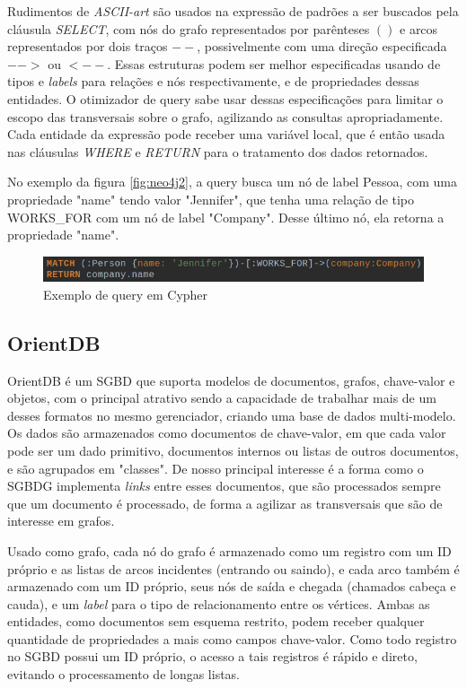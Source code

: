 \documentclass[conference]{IEEEtran}
\begin{document}
Rudimentos de \emph{ASCII-art} são usados na expressão de padrões a ser buscados pela cláusula \emph{SELECT}, com nós do grafo representados por parênteses $()$ e arcos representados por dois traços $--$, possivelmente com uma direção especificada $-->$ ou $<--$. Essas estruturas podem ser melhor especificadas usando de tipos e \emph{labels} para relações e nós respectivamente, e de propriedades dessas entidades. O otimizador de query sabe usar dessas especificações para limitar o escopo das transversais sobre o grafo, agilizando as consultas apropriadamente. Cada entidade da expressão pode receber uma variável local, que é então usada nas cláusulas \emph{WHERE} e \emph{RETURN} para o tratamento dos dados retornados.

No exemplo da figura \ref{fig:neo4j2}, a query busca um nó de label Pessoa, com uma propriedade "name" tendo valor "Jennifer", que tenha uma relação de tipo WORKS\_FOR com um nó de label "Company". Desse último nó, ela retorna a propriedade "name".

\begin{figure}[htbp]
\centerline{\includegraphics[width=0.9\linewidth]{img/neo4j/neo4j_ps2.png}}
\caption{Exemplo de query em Cypher}\label{fig:neo4j2}
\label{fig}
\end{figure}

\subsection{OrientDB}

OrientDB é um SGBD que suporta modelos de documentos, grafos, chave-valor e objetos, com o principal atrativo sendo a capacidade de trabalhar mais de um desses formatos no mesmo gerenciador, criando uma base de dados multi-modelo. Os dados são armazenados como documentos de chave-valor, em que cada valor pode ser um dado primitivo, documentos internos ou listas de outros documentos, e são agrupados em "classes". De nosso principal interesse é a forma como o SGBDG implementa \emph{links} entre esses documentos, que são processados sempre que um documento é processado, de forma a agilizar as transversais que são de interesse em grafos.

Usado como grafo, cada nó do grafo é armazenado como um registro com um ID próprio e as listas de arcos incidentes (entrando ou saindo), e cada arco também é armazenado com um ID próprio, seus nós de saída e chegada (chamados cabeça e cauda), e um \emph{label} para o tipo de relacionamento entre os vértices. Ambas as entidades, como documentos sem esquema restrito, podem receber qualquer quantidade de propriedades a mais como campos chave-valor. Como todo registro no SGBD possui um ID próprio, o acesso a tais registros é rápido e direto, evitando o processamento de longas listas.
\end{document}
